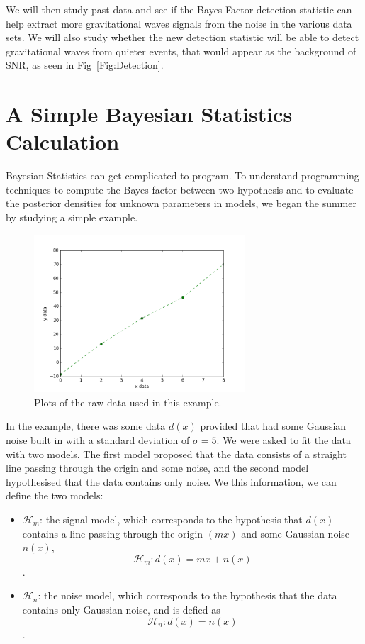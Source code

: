 \documentclass{article}
\begin{document}
 We will then study past data and see if the Bayes Factor detection statistic can help extract more gravitational waves signals from the noise in the various data sets. We will also study whether the new detection statistic will be able to detect gravitational waves from quieter events, that would appear as the background of SNR, as seen in Fig~\ref{Fig:Detection}.
 
 
 
 \section{A Simple Bayesian Statistics Calculation}
 
 Bayesian Statistics can get complicated to program. To understand programming techniques to compute the Bayes factor between two hypothesis and to evaluate the posterior densities for unknown parameters in models, we began the summer by studying a simple example. \\
 
 \begin{figure}[h]
 	\centering 	\includegraphics[width=0.7\textwidth]{Figures/rawData.png} 
 	\caption{Plots of the raw data used in this example.}
 	\label{Fig:origData}
 \end{figure}
 
 
 In the example, there was some data $d(x)$ provided that had some Gaussian noise built in with a standard deviation of $\sigma = 5$. We were asked to fit the data with two models. The first model proposed that the data consists of a straight line passing through the origin and some noise, and the second model hypothesised that the data contains only noise. We this information, we can define the two models: \\
 \begin{itemize}
 	\item $\mathcal{H}_{m}$: the signal model, which corresponds to the hypothesis that $d(x)$ contains a line passing through the origin $(mx)$ and some Gaussian noise $n(x)$,
 	$$\mathcal{H}_{m}: d(x) = mx + n(x)$$.
 	\item $\mathcal{H}_{n}$: the noise model, which corresponds to the hypothesis that the data contains only Gaussian noise, and is defied as $$\mathcal{H}_{n}: d(x) = n(x)$$.
 \end{itemize}
 
\end{document}
